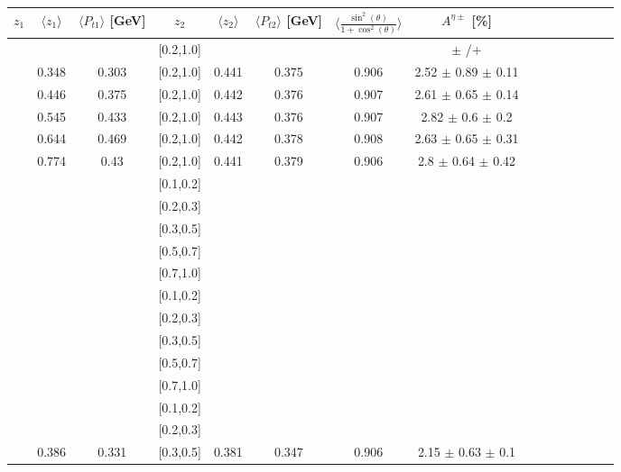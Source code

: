 \begin{table}[H]\tiny
\centering
\renewcommand{\arraystretch}{1.5}
\begin{tabular}{|c| c| c| c| c| c| c| c| c| c|c| c| c| c| c|}
\hline
$z_1$ & $\langle  z_1\rangle$ & $\langle  P_{t1} \rangle$  [GeV] & $z_2$ & $\langle  z_2 \rangle$ & $\langle  P_{t2}  \rangle$ [GeV] & $\langle\frac{\sin^2(\theta)}{1+\cos^2(\theta)}\rangle$ & $A^{\eta\pm}$ [\%]  \\ \hline
[0.2,0.3]	&		&		&	[0.2,1.0]	&		&		&		&		$\pm$			/+		\\ \hline
[0.3,0.4]	&	0.348	&	0.303	&	[0.2,1.0]	&	0.441	&	0.375	&	0.906	&2.52  $\pm$ 0.89  $\pm$ 0.11   \\ \hline
[0.4,0.5]	&	0.446	&	0.375	&	[0.2,1.0]	&	0.442	&	0.376	&	0.907	&2.61  $\pm$ 0.65  $\pm$ 0.14   \\ \hline
[0.5,0.6]	&	0.545	&	0.433	&	[0.2,1.0]	&	0.443	&	0.376	&	0.907	&2.82  $\pm$ 0.6  $\pm$ 0.2     \\ \hline
[0.6,0.7]	&	0.644	&	0.469	&	[0.2,1.0]	&	0.442	&	0.378	&	0.908	&2.63  $\pm$ 0.65  $\pm$ 0.31   \\ \hline
[0.7,1.0]	&	0.774	&	0.43	&	[0.2,1.0]	&	0.441	&	0.379	&	0.906	&2.8  $\pm$ 0.64  $\pm$ 0.42    \\ \hline
\hline
[0.1,0.2]	&		&		&	[0.1,0.2]	&		&		&		&							\\ \hline
[0.1,0.2]	&		&		&	[0.2,0.3]	&		&		&		&							\\ \hline
[0.1,0.2]	&		&		&	[0.3,0.5]	&		&		&		&							\\ \hline
[0.1,0.2]	&		&		&	[0.5,0.7]	&		&		&		&							\\ \hline
[0.1,0.2]	&		&		&	[0.7,1.0]	&		&		&		&							\\ \hline
\hline
[0.2,0.3]	&		&		&	[0.1,0.2]	&		&		&		&							\\ \hline
[0.2,0.3]	&		&		&	[0.2,0.3]	&		&		&		&							\\ \hline
[0.2,0.3]	&		&		&	[0.3,0.5]	&		&		&		&							\\ \hline
[0.2,0.3]	&		&		&	[0.5,0.7]	&		&		&		&							\\ \hline
[0.2,0.3]	&		&		&	[0.7,1.0]	&		&		&		&							\\ \hline
\hline
[0.3,0.5]	&		&		&	[0.1,0.2]	&		&		&		&							\\ \hline
[0.3,0.5]	&		&		&	[0.2,0.3]	&		&		&		&							\\ \hline
[0.3,0.5]	&	0.386	&	0.331	&	[0.3,0.5]	&	0.381	&	0.347	&	0.906	&	2.15  $\pm$ 0.63  $\pm$ 0.1     \\ \hline

\end{tabular}
\end{table}
